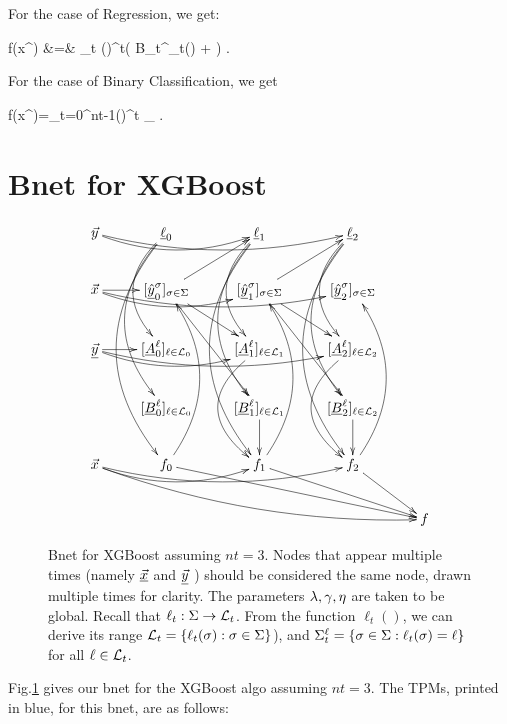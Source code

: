 For the case of Regression, we get:

\beqa
f(x^\s)
&=&
\sum_t (\eta)^t\left(
{B_t^{\ell_t(\s)} + \lam}
\right)
\;.
\eeqa

For the case of Binary Classification,
 we get

\beq
f(x^\s)=\sum_{t=0}^{nt-1}(\eta)^t
_{}
\;.
\eeq

\section{Bnet for XGBoost}




\begin{figure}[h!]
$$
\xymatrix{
\vec{y}\ar@/_1pc/[rr]\ar@/_1pc/[rrr]
&\ul{\ell}_0 \ar@/_2pc/[dd]\ar@/_2.5pc/[ddd]\ar@/_3pc/[dddd]
&\ul{\ell}_1 \ar@/_2pc/[dd]\ar@/_2.5pc/[ddd]\ar@/_3pc/[dddd]
&\ul{\ell}_2 \ar@/_2pc/[dd]\ar@/_2.5pc/[ddd]\ar@/_3pc/[dddd]
\\
\vec{x}\ar[r]\ar@/_1pc/[rr]\ar@/_1pc/[rrr]
&[\ul{\haty}^\s_0]_{\s\in\Sigma}\ar[rdd]
\ar[rd]\ar[ru]
&
[\ul{\haty}^\s_1]_{\s\in\Sigma}\ar[rdd]
\ar[rd]\ar[ru]
&
[\ul{\haty}^\s_2]_{\s\in\Sigma}
\\
\ul{\vecy}\ar[r]\ar@/_1pc/[rr]\ar@/_1pc/[rrr]
&[\ul{A}^\ell_0]_{\ell\in\call_0}
&
[\ul{A}^\ell_1]_{\ell\in\call_1}\ar@/_2.5pc/[dd]
&
[\ul{A}^\ell_2]_{\ell\in\call_2}\ar@/_2.5pc/[dd]
\\
&[\ul{B}^\ell_0]_{\ell\in\call_0}
&
[\ul{B}^\ell_1]_{\ell\in\call_1}\ar[d]
&
[\ul{B}^\ell_2]_{\ell\in\call_2}\ar[d]
\\
\vec{x}\ar@/_1pc/[drrrr]
\ar@/_1pc/[rr]\ar@/_1pc/[rrr]
&f_0\ar[drrr]\ar@/_2pc/[uuu]
&f_1\ar[drr]\ar@/_2pc/[uuu]
&f_2\ar[dr]\ar@/_2pc/[uuu]
\\
&&&&f
}$$
\caption{Bnet for XGBoost assuming $nt=3$. 
Nodes that appear
multiple
times (namely $\underline{{\vec{x}}}$ and $\underline{{\vec{y}}}$ )
should be considered the same node,
drawn multiple times for  clarity.
The parameters $\lambda, \gamma, \eta$ are 
taken to be global. Recall that
$\ell_t:\Sigma\rightarrow {\cal L}_t$.
From the function $\ell_t()$, we can derive
its range ${\cal L}_t=\{\ell_t(\sigma):\sigma\in\Sigma\}$),
and 
$\Sigma^\ell_t=\{\sigma\in\Sigma: \ell_t(\sigma)=\ell\}
$ for all $\ell\in {\cal L}_t$.}
\label{fig-xgb-bnet}
\end{figure}

Fig.\ref{fig-xgb-bnet}
gives our bnet for the XGBoost algo
assuming $nt=3$.
The TPMs, printed in blue,
for this bnet, are as follows:


